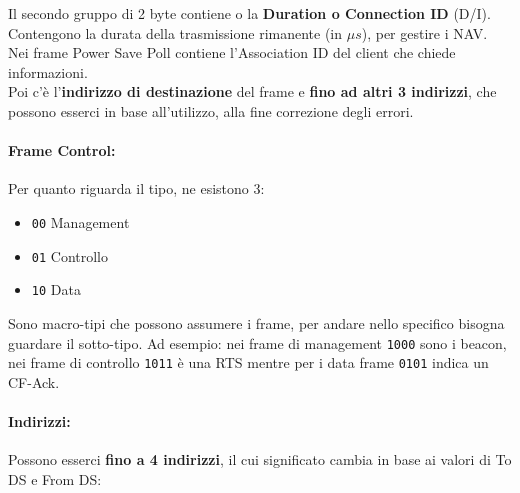 Il secondo gruppo di 2 byte contiene o la \textbf{Duration o Connection ID} (D/I). Contengono la durata della trasmissione rimanente (in $\mu s$), per gestire i NAV. Nei frame Power Save Poll contiene l'Association ID del client che chiede informazioni.\\

Poi c'è l'\textbf{indirizzo di destinazione} del frame e \textbf{fino ad altri 3 indirizzi}, che possono esserci in base all'utilizzo, alla fine correzione degli errori. \\

\paragraph{Frame Control:} Per quanto riguarda il tipo, ne esistono 3:
\begin{itemize}
	\item \texttt{00} Management
	\item \texttt{01} Controllo
	\item \texttt{10} Data
\end{itemize}
Sono macro-tipi che possono assumere i frame, per andare nello specifico bisogna guardare il sotto-tipo.  Ad esempio: nei frame di management \texttt{1000} sono i beacon, nei frame di controllo \texttt{1011} è una RTS mentre per i data frame \texttt{0101} indica un CF-Ack.\\

\paragraph{Indirizzi:} Possono esserci \textbf{fino a 4 indirizzi}, il cui significato cambia in base ai valori di To DS e From DS: 

